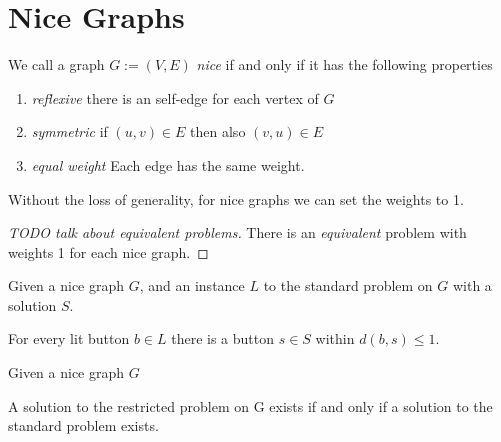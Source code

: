 \section{Nice Graphs}
We call a graph $G:=(V, E)$ \emph{nice} if and only if it has the following properties

\begin{enumerate}
    \item \emph{reflexive} there is an self-edge for each vertex of $G$
    \item \emph{symmetric} if $(u,v)\in E$ then also $(v,u)\in E$
    \item \emph{equal weight} Each edge has the same weight.
\end{enumerate}

Without the loss of generality, for nice graphs we can set the weights to 1.

\begin{proof}[TODO talk about equivalent problems]
    There is an \emph{equivalent} problem with weights 1 for each nice graph.
\end{proof}

\begin{lemma}\label{close-press-button}
    Given a nice graph $G$, and an instance $L$ to the standard problem on $G$ with a solution $S$.

    For every lit button $b\in L$ there is a button $s\in S$ within $d(b,s) \leq 1$. 
\end{lemma}

\begin{lemma}\label{restricted-solution}
    Given a nice graph $G$

    A solution to the restricted problem on G exists if and only if a solution to the standard problem exists.
\end{lemma}

